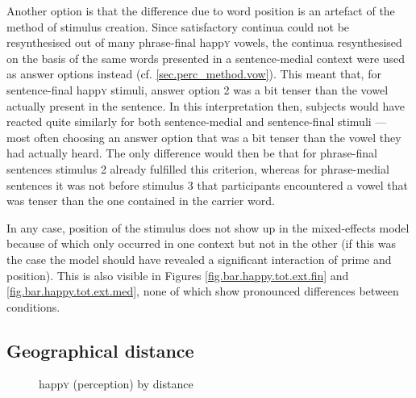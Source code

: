 Another option is that the difference due to word position is an artefact of the method of stimulus creation.
Since satisfactory continua could not be resynthesised out of many phrase-final happ\textsc{y} vowels, the continua resynthesised on the basis of the same words presented in a sentence-medial context were used as answer options instead (cf. \ref{sec.perc_method.vow}).
This meant that, for sentence-final happ\textsc{y} stimuli, answer option 2 was a bit tenser than the vowel actually present in the sentence.
In this interpretation then, subjects would have reacted quite similarly for both sentence-medial and sentence-final stimuli --- most often choosing an answer option that was a bit tenser than the vowel they had actually heard.
The only difference would then be that for phrase-final sentences stimulus 2 already fulfilled this criterion, whereas for phrase-medial sentences it was not before stimulus 3 that participants encountered a vowel that was tenser than the one contained in the carrier word.

In any case, position of the stimulus does not show up in the mixed-effects model because of  which only occurred in one context but not in the other (if this was the case the model should have revealed a significant interaction of prime and position).
This is also visible in Figures \ref{fig.bar.happy.tot.ext.fin} and \ref{fig.bar.happy.tot.ext.med}, none of which show pronounced differences between  conditions.

\subsection{Geographical distance}
\label{sec.perc_res.happy.geography}

\begin{figure}[h]
	\centering
		\resizebox{.49\linewidth}{!}{} 
	\caption{happ\textsc{y} (perception) by distance}
	\label{fig.scatter.happy.ext.dist}
\end{figure}

